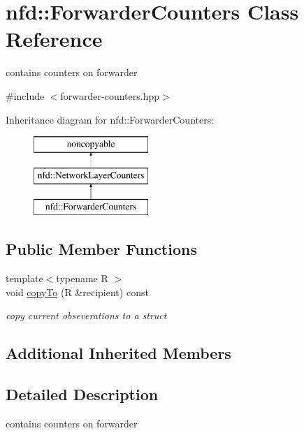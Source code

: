 \hypertarget{classnfd_1_1ForwarderCounters}{}\section{nfd\+:\+:Forwarder\+Counters Class Reference}
\label{classnfd_1_1ForwarderCounters}


contains counters on forwarder  




{\ttfamily \#include $<$forwarder-\/counters.\+hpp$>$}

Inheritance diagram for nfd\+:\+:Forwarder\+Counters\+:\begin{figure}[H]
\begin{center}
\leavevmode
\includegraphics[height=3.000000cm]{classnfd_1_1ForwarderCounters}
\end{center}
\end{figure}
\subsection*{Public Member Functions}
\begin{DoxyCompactItemize}
\item 
{\footnotesize template$<$typename R $>$ }\\void \hyperlink{classnfd_1_1ForwarderCounters_a34df2149d486ac35d6f7aa75a32fa684}{copy\+To} (R \&recipient) const
\begin{DoxyCompactList}\small\item\em copy current obseverations to a struct \end{DoxyCompactList}\end{DoxyCompactItemize}
\subsection*{Additional Inherited Members}


\subsection{Detailed Description}
contains counters on forwarder 

